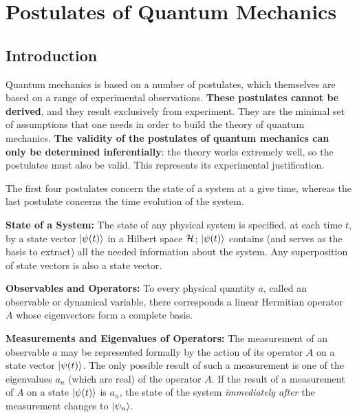 \section{Postulates of Quantum Mechanics}

\subsection{Introduction}

Quantum mechanics is based on a number of postulates, which themselves are based on a range of experimental observations. \textbf{These postulates cannot be derived}, and they result exclusively from experiment. They are the minimal set of assumptions that one needs in order to build the theory of quantum mechanics. \textbf{The validity of the postulates of quantum mechanics can only be determined inferentially}: the theory works extremely well, so the postulates must also be valid. This represents its experimental justification.

The first four postulates concern the state of a system at a give time, whereas the last postulate concerns the time evolution of the system.

\begin{postulate} \label{post_1}
    \textbf{State of a System:} The state of any physical system is specified, at each time $t$, by a state vector $\ket{\psi(t)}$ in a Hilbert space $\mathcal{H}$; $\ket{\psi(t)}$ contains (and serves as the basis to extract) all the needed information about the system. Any superposition of state vectors is also a state vector.
\end{postulate}

\begin{postulate} \label{post_2}
    \textbf{Observables and Operators:} To every physical quantity $a$, called an observable or dynamical variable, there corresponds a linear Hermitian operator $A$ whose eigenvectors form a complete basis.
\end{postulate}

\begin{postulate} \label{post_3}
    \textbf{Measurements and Eigenvalues of Operators:} The measurement of an observable $a$ may be represented formally by the action of its operator $A$ on a state vector $\ket{\psi(t)}$. The only possible result of such a measurement is one of the eigenvalues $a_n$ (which are real) of the operator $A$. If the result of a measurement of $A$ on a state $\ket{\psi(t)}$ is $a_n$, the state of the system \textit{immediately after} the measurement changes to $\ket{\psi_n}$.
\end{postulate}

